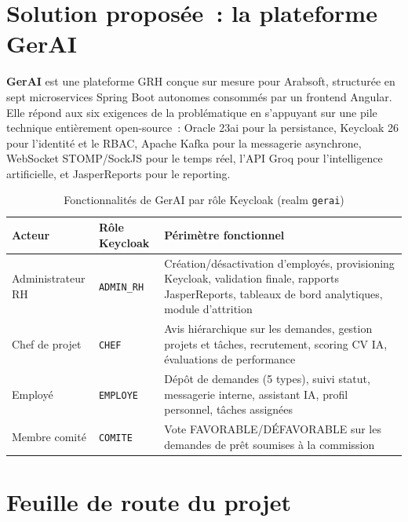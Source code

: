 \section{Solution proposée~: la plateforme GerAI}

\textbf{GerAI} est une plateforme GRH conçue sur mesure pour Arabsoft, structurée
en sept microservices Spring Boot autonomes consommés par un frontend Angular.
Elle répond aux six exigences de la problématique en s'appuyant sur une pile
technique entièrement open-source~: Oracle 23ai pour la persistance, Keycloak 26
pour l'identité et le RBAC, Apache Kafka pour la messagerie asynchrone,
WebSocket STOMP/SockJS pour le temps réel, l'API Groq pour l'intelligence
artificielle, et JasperReports pour le reporting.

\begin{table}[H]
\centering
\caption{Fonctionnalités de GerAI par rôle Keycloak (realm \texttt{gerai})}
\label{tab:roles}
\begin{tabularx}{\textwidth}{|l|l|L|}
\hline
{}\textbf{Acteur} & \textbf{Rôle Keycloak} & \textbf{Périmètre fonctionnel} \\\hline
{}
Administrateur RH & \texttt{ADMIN\_RH} &
  Création/désactivation d'employés, provisioning Keycloak, validation finale,
  rapports JasperReports, tableaux de bord analytiques, module d'attrition \\\hline
Chef de projet & \texttt{CHEF} &
  Avis hiérarchique sur les demandes, gestion projets et tâches, recrutement,
  scoring CV IA, évaluations de performance \\\hline
{}
Employé & \texttt{EMPLOYE} &
  Dépôt de demandes (5 types), suivi statut, messagerie interne, assistant IA,
  profil personnel, tâches assignées \\\hline
Membre comité & \texttt{COMITE} &
  Vote FAVORABLE/DÉFAVORABLE sur les demandes de prêt soumises à la commission \\\hline
\end{tabularx}
\end{table}

\section{Feuille de route du projet}

